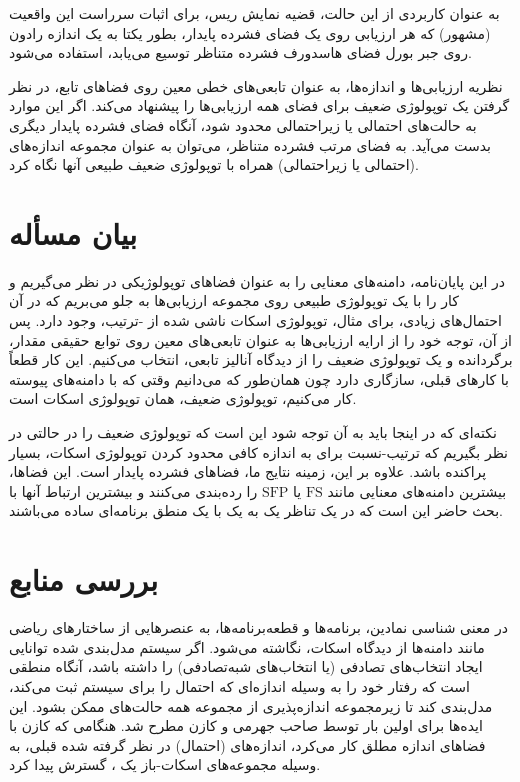 \documentclass[12pt,a4paper]{article}
\theoremstyle{definition}
\theoremstyle{theorem}
\theoremstyle{definition}
\begin{document}
به عنوان کاربردی از این حالت،  قضیه نمایش ریس، برای اثبات سرراست این واقعیت (مشهور) که هر ارزیابی روی یک فضای فشرده پایدار، بطور یکتا به یک اندازه رادون روی جبر بورل فضای هاسدورف فشرده متناظر توسیع می‌یابد، استفاده می‌شود.
 
 نظریه ارزیابی‌ها و اندازه‌ها، به عنوان تابعی‌های خطی معین روی فضاهای تابع، در نظر گرفتن یک توپولوژی ضعیف برای فضای همه ارزیابی‌ها را پیشنهاد می‌کند. اگر این موارد به حالت‌های احتمالی یا زیراحتمالی محدود شود، آنگاه فضای فشرده پایدار دیگری بدست می‌آید. به فضای مرتب فشرده متناظر، می‌توان به عنوان مجموعه اندازه‌های (احتمالی یا زیراحتمالی) همراه با توپولوژی ضعیف طبیعی آنها نگاه کرد. 
\section{ بیان مسأله}
در این پایان‌نامه، دامنه‌های معنایی را به عنوان فضاهای توپولوژیکی در نظر می‌گیریم و کار را با یک توپولوژی طبیعی روی مجموعه ارزیابی‌ها به جلو می‌بریم که در آن احتمال‌های زیادی، برای مثال، توپولوژی اسکات ناشی شده از 
%
-ترتیب، وجود دارد. پس از آن، توجه خود را از ارایه ارزیابی‌ها به عنوان تابعی‌های معین روی توابع حقیقی مقدار، برگردانده و یک توپولوژی ضعیف را از دیدگاه آنالیز تابعی، انتخاب می‌کنیم. این کار قطعاً با کارهای قبلی، سازگاری دارد چون همان‌طور که می‌دانیم وقتی که با دامنه‌های پیوسته کار می‌کنیم، توپولوژی ضعیف، همان توپولوژی اسکات است. 

نکته‌ای که در اینجا باید به آن توجه شود این است که توپولوژی ضعیف را در حالتی در نظر بگیریم که ترتیب-نسبت برای به اندازه کافی محدود کردن توپولوژی اسکات، بسیار پراکنده باشد. علاوه بر این، زمینه نتایج ما، فضاهای فشرده پایدار است. این فضاها، بیشترین دامنه‌های معنایی مانند 
$\mathrm{FS}  $
یا
$ \mathrm{SFP} $
 را رده‌بندی می‌کنند و بیشترین ارتباط آنها با بحث حاضر این است که در یک تناظر یک به یک با یک منطق برنامه‌ای ساده می‌باشند.
\section{ بررسی منابع } 
در معنی شناسی نمادین، برنامه‌ها و قطعه‌برنامه‌ها، به عنصرهایی از ساختارهای ریاضی مانند دامنه‌ها از دیدگاه اسکات، نگاشته می‌شود. اگر سیستم مدل‌بندی شده توانایی ایجاد انتخاب‌های تصادفی (یا انتخاب‌های شبه‌تصادفی) را داشته باشد، آنگاه منطقی است که رفتار خود را به وسیله اندازه‌ای که احتمال را برای سیستم ثبت می‌کند، مدل‌بندی کند تا زیرمجموعه‌ اندازه‌پذیری از مجموعه همه حالت‌های ممکن بشود. این ایده‌ها برای اولین بار توسط صاحب ‌جهرمی\cite{saheb} و کازن\cite{kozen}
مطرح شد. هنگامی که کازن با فضاهای اندازه مطلق کار می‌کرد، اندازه‌های (احتمال) در نظر گرفته شده قبلی، به وسیله مجموعه‌های اسکات-باز یک ، گسترش پیدا کرد.
\end{document}

